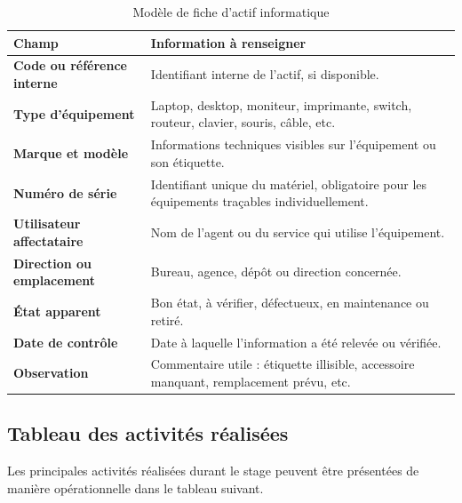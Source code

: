 \documentclass[12pt,a4paper]{report}
\begin{document}
\begin{table}[h!]
\centering
\caption{Modèle de fiche d'actif informatique}
\begin{tabularx}{\textwidth}{>{\bfseries}p{4.2cm}X}
\toprule
Champ & Information à renseigner \\
\midrule
Code ou référence interne & Identifiant interne de l'actif, si disponible. \\
Type d'équipement & Laptop, desktop, moniteur, imprimante, switch, routeur, clavier, souris, câble, etc. \\
Marque et modèle & Informations techniques visibles sur l'équipement ou son étiquette. \\
Numéro de série & Identifiant unique du matériel, obligatoire pour les équipements traçables individuellement. \\
Utilisateur affectataire & Nom de l'agent ou du service qui utilise l'équipement. \\
Direction ou emplacement & Bureau, agence, dépôt ou direction concernée. \\
État apparent & Bon état, à vérifier, défectueux, en maintenance ou retiré. \\
Date de contrôle & Date à laquelle l'information a été relevée ou vérifiée. \\
Observation & Commentaire utile : étiquette illisible, accessoire manquant, remplacement prévu, etc. \\
\bottomrule
\end{tabularx}
\end{table}

\subsection{Tableau des activités réalisées}

Les principales activités réalisées durant le stage peuvent être présentées de manière opérationnelle dans le tableau suivant.
\end{document}

